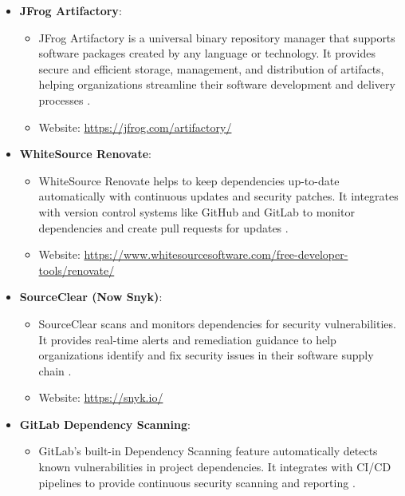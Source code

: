 \begin{itemize}
\begin{itemize}
		\item Website: \url{https://www.sonatype.com/nexus/repository-oss}
	\end{itemize}
	
	\item \textbf{JFrog Artifactory}:
	\begin{itemize}
		\item JFrog Artifactory is a universal binary repository manager that supports
		software packages created by any language or technology. It provides
		secure and efficient storage, management, and distribution of artifacts,
		helping organizations streamline their software development and delivery
		processes \cite{Artifactory:2024}.
		
		\item Website: \url{https://jfrog.com/artifactory/}
	\end{itemize}
	
	\item \textbf{WhiteSource Renovate}:
	\begin{itemize}
		\item WhiteSource Renovate helps to keep dependencies up-to-date automatically
		with continuous updates and security patches. It integrates with version
		control systems like GitHub and GitLab to monitor dependencies and
		create pull requests for updates \cite{Mend:2024}.
		
		\item Website:
		\url{https://www.whitesourcesoftware.com/free-developer-tools/renovate/}
	\end{itemize}
	
	\item \textbf{SourceClear (Now Snyk)}:
	\begin{itemize}
		\item SourceClear scans and monitors dependencies for security vulnerabilities.
		It provides real-time alerts and remediation guidance to help
		organizations identify and fix security issues in their software supply
		chain \cite{Synk:2024}.
		
		\item Website: \url{https://snyk.io/}
	\end{itemize}
	
	\item \textbf{GitLab Dependency Scanning}:
	\begin{itemize}
		\item GitLab's built-in Dependency Scanning feature automatically detects known
		vulnerabilities in project dependencies. It integrates with CI/CD
		pipelines to provide continuous security scanning and reporting
		\cite{Dependency:2024}.
		

\end{itemize}
\end{itemize}
